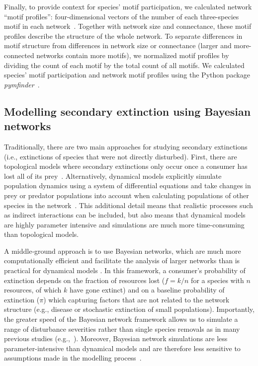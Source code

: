 \documentclass[12pt]{article}
\begin{document}
\begin{spacing}{2.0}
        
        Finally, to provide context for species' motif participation, we calculated network ``motif profiles'': four-dimensional vectors of the number of each three-species motif in each network~\citep{Stouffer2012}.
        Together with network size and connectance, these motif profiles describe the structure of the whole network.
        To separate differences in motif structure from differences in network size or connectance (larger and more-connected networks contain more motifs), we normalized motif profiles by dividing the count of each motif by the total count of all motifs. 
        We calculated species' motif participation and network motif profiles using the Python package \emph{pymfinder}~\citep{pymfinder}.

    
    \subsection*{Modelling secondary extinction using Bayesian networks}


        Traditionally, there are two main approaches for studying secondary extinctions (i.e., extinctions of species that were not directly disturbed). 
        First, there are topological models where secondary extinctions only occur once a consumer has lost all of its prey~\citep{dunne2009cascading}. 
        Alternatively, dynamical models explicitly simulate population dynamics using a system of differential equations and take changes in prey or predator populations into account when calculating populations of other species in the network~\citep{binzer2011susceptibility}. 
        This additional detail means that realistic processes such as indirect interactions can be included, but also means that dynamical models are highly parameter intensive and simulations are much more time-consuming than topological models. 
        
        
        A middle‐ground approach is to use Bayesian networks, which are much more computationally efficient and facilitate the analysis of larger networks than is practical for dynamical models \citep{Eklof2013,Haussler2020}. 
        In this framework, a consumer's probability of extinction depends on the fraction of resources lost ($f = k/n$ for a species with $n$ resources, of which $k$ have gone extinct) and on a baseline probability of extinction ($\pi$) which capturing factors that are not related to the network structure (e.g., disease or stochastic extinction of small populations).
        Importantly, the greater speed of the Bayesian network framework allows us to simulate a range of disturbance severities rather than single species removals as in many previous studies (e.g.,~\citealp[]{Memmott2004,Staniczenko2010,Dunne2004,Cirtwill2022Oikos}).
        Moreover, Bayesian network simulations are less parameter-intensive than dynamical models and are therefore less sensitive to assumptions made in the modelling process~\citep{Eklof2013}.


\end{spacing}
\end{document}
